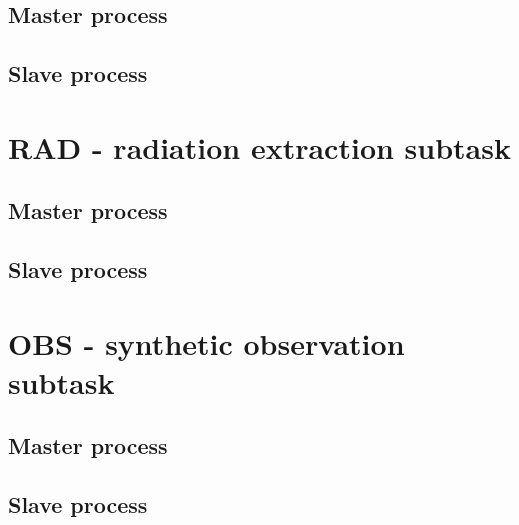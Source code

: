 \subsection{Master process}
\subsection{Slave process}

\section{RAD - radiation extraction subtask}
\subsection{Master process}
\subsection{Slave process}

\section{OBS - synthetic observation subtask}
\subsection{Master process}
\subsection{Slave process}
